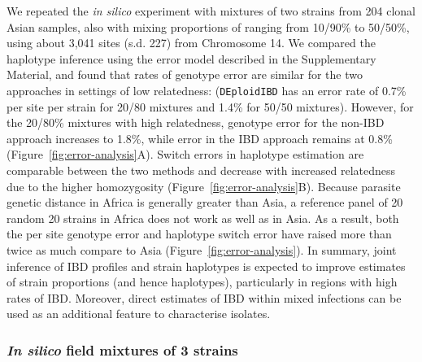 \documentclass[9pt]{article}
\begin{document}




We repeated the \emph{in silico} experiment with mixtures of two strains from 204 clonal Asian samples, also with mixing proportions of ranging from 10/90\% to 50/50\%, using about 3,041 sites (s.d. 227) from Chromosome 14. We compared the haplotype inference using the error model described in the Supplementary Material, and found that rates of genotype error are similar for the two approaches in settings of low relatedness: ({\tt DEploidIBD} has an error rate of 0.7\% per site per strain for 20/80 mixtures and 1.4\% for 50/50 mixtures).  However, for the 20/80\% mixtures with high relatedness, genotype error for the non-IBD approach increases to 1.8\%, while error in the IBD approach remains at 0.8\% (Figure~\ref{fig:error-analysis}A). Switch errors in haplotype estimation are comparable between the two methods and decrease with increased relatedness due to the higher homozygosity (Figure~\ref{fig:error-analysis}B).
Because parasite genetic distance in Africa is generally greater than Asia, a reference panel of 20 random 20 strains in Africa does not work as well as in Asia. As a result, both the per site genotype error and haplotype switch error have raised more than twice as much compare to Asia (Figure~\ref{fig:error-analysis}).
In summary, joint inference of IBD profiles and strain haplotypes is expected to improve estimates of strain proportions (and hence haplotypes), particularly in regions with high rates of IBD. Moreover, direct estimates of IBD within mixed infections can be used as an additional feature to characterise isolates.


\subsubsection{{\it In silico} field mixtures of 3 strains}
\end{document}
